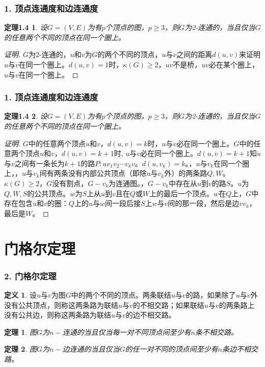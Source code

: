 \documentclass{beamer}
\newtheorem{Thm}{定理}[section]
\newtheorem*{Thm1.4}{定理1.4}
\theoremstyle{definition}
\newtheorem{Def}{定义}[section]
\theoremstyle{example}
\begin{document}
\begin{CJK}{UTF8}{gbsn}
\begin{frame}[t]
  \frametitle{1. 顶点连通度和边连通度}
  \begin{Thm1.4}
    设$G=(V,E)$为有$p$个顶点的图，$p \geq 3$，则$G$为2-连通的，当且仅当$G$的任意两个不同的顶点在同一个圈上。
  \end{Thm1.4}
  \begin{proof}[证明]\justifying\let\raggedright\justifying
    $G$为2-连通的，\pause$u$和$v$为$G$的两个不同的顶点，$u$与$v$之间的距离$d(u,v)$来证明$u$与$v$在同一个圈上。$d(u,v)=1$时，$\kappa(G)\geq 2$，$uv$不是桥，$uv$必在某个圈上，$u$与$v$在同一个圈上。


  \end{proof}
\end{frame}

\begin{frame}[t]
  \frametitle{1. 顶点连通度和边连通度}
  \begin{Thm1.4}
    设$G=(V,E)$为有$p$个顶点的图，$p \geq 3$，则$G$为2-连通的，当且仅当$G$的任意两个不同的顶点在同一个圈上。
  \end{Thm1.4}
  \begin{proof}[证明]
    \justifying\let\raggedright\justifying
{}$G$中的任意两个顶点$u$和$v$，$d(u,v)=k$时，\pause$u$与$v$必在同一个圈上。$G$中的任意两个顶点$u$和$v$，$d(u,v)=k+1$时, \pause$u$与$v$必在同一个圈上。$d(u,v)=k+1$知$u$与$v$之间有一条长为$k+1$的路$P:uv_1v_2\cdots v_kv$。$d(u,v_k)=k$。，\pause$u$与$v_k$在同一个圈上，，\pause$u$与$v_k$间有两条没有内部公共顶点（即除u与$v_k$外）的两条路$Q,W$。$\kappa(G)\geq 2$，$G$没有割点，$G-v_k$为连通图。，\pause$G-v_k$中存在从$u$到$v$的路$S$。\pause$u$为$Q,W,S$的公共顶点。$w$为$S$上从$u$到$v$且在$Q$或$W$上的最后一个顶点。$w$在$Q$上，$G$中存在包含$u$和$v$的圈：$Q$上的$u$与$w$间一段后接$S$上$w$与$v$间的那一段，然后是边$vv_k$，最后是$W$。
  \end{proof}
\end{frame}
\section{门格尔定理}

\begin{frame}
  \frametitle{2. 门格尔定理}
    \begin{Def}
    设$u$与$v$为图$G$中的两个不同的顶点。两条联结$u$与$v$的路，如果除了$u$与$v$外没有公共顶点，则称这两条路为联结$u$与$v$的\alert{不相交路}；如果联结$u$与$v$的两条路上没有公共边，则称这两条路为联结$u$与$v$的\alert{边不相交路}。
  \end{Def}
  \begin{Thm}
    图$G$为$n-$连通的当且仅当每一对不同顶点间至少有$n$条不相交路。
  \end{Thm}
  \begin{Thm}
    图$G$为$n-$边连通的当且仅当$G$的任一对不同的顶点间至少有$n$条边不相交路。
  \end{Thm}
\end{frame}


\end{CJK}
\end{document}
